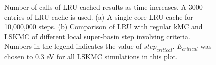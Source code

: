 \begingroup
\begin{figure}[!ht]
  \centering
  \label{Chap:Al/Vac:fig:lru_calls:a}
  \label{Chap:Al/Vac:fig:lru_calls:b}
\caption[Number of calls of \ac{LRU} cached results as time increases.]{Number of calls of \ac{LRU} cached results as time increases. A 3000-entries of \ac{LRU} cache is used. (a) A single-core \ac{LRU} cache for 10,000,000 steps. (b) Comparison of \ac{LRU} with regular \ac{kMC} and \ac{LSKMC} of different local super-basin step involving criteria. Numbers in the legend indicates the value of $step_{critical}$. $E_{critical}$ was chosen to $0.3$ eV for all \ac{LSKMC} simulations in this plot.}
\label{Chap:Al/Vac:fig:lru_calls}
\end{figure}
\endgroup


